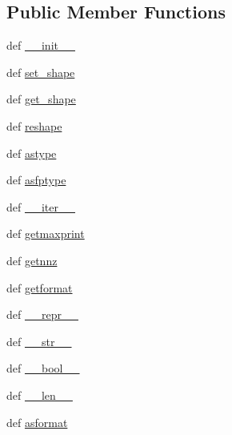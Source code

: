 \subsection*{Public Member Functions}
\begin{DoxyCompactItemize}
\item 
def \hyperlink{classscipy_1_1sparse_1_1base_1_1spmatrix_a10682329413058faa2f58e4ad34b4469}{\+\_\+\+\_\+init\+\_\+\+\_\+}
\item 
def \hyperlink{classscipy_1_1sparse_1_1base_1_1spmatrix_a03816f51d9e91beff4dbf94513633f03}{set\+\_\+shape}
\item 
def \hyperlink{classscipy_1_1sparse_1_1base_1_1spmatrix_af997a3ba2bc4ea75684e7c1d35b5f38c}{get\+\_\+shape}
\item 
def \hyperlink{classscipy_1_1sparse_1_1base_1_1spmatrix_a659aba351a0a4a8644d0ce277e8a10e7}{reshape}
\item 
def \hyperlink{classscipy_1_1sparse_1_1base_1_1spmatrix_a7c742f4c084727a9bc2ea1edb2e3ab0b}{astype}
\item 
def \hyperlink{classscipy_1_1sparse_1_1base_1_1spmatrix_ab9e8119cf7b76b3cf30a1f1e4e835a8f}{asfptype}
\item 
def \hyperlink{classscipy_1_1sparse_1_1base_1_1spmatrix_aa4b0ce202287c59f20d8e525cf7e1c72}{\+\_\+\+\_\+iter\+\_\+\+\_\+}
\item 
def \hyperlink{classscipy_1_1sparse_1_1base_1_1spmatrix_a2c7726a305fe36c1f869f68add4b4112}{getmaxprint}
\item 
def \hyperlink{classscipy_1_1sparse_1_1base_1_1spmatrix_ab149f40b950bc9503e780bc888fd8862}{getnnz}
\item 
def \hyperlink{classscipy_1_1sparse_1_1base_1_1spmatrix_a8a577d4d1010c6462ef857346de67866}{getformat}
\item 
def \hyperlink{classscipy_1_1sparse_1_1base_1_1spmatrix_a0c98d350fc579a084745bca274bb531e}{\+\_\+\+\_\+repr\+\_\+\+\_\+}
\item 
def \hyperlink{classscipy_1_1sparse_1_1base_1_1spmatrix_acf168ad8726219a0a6f4cd3f3901456b}{\+\_\+\+\_\+str\+\_\+\+\_\+}
\item 
def \hyperlink{classscipy_1_1sparse_1_1base_1_1spmatrix_aeeb4893e3d9b05c2cfdc83d2f3a671b1}{\+\_\+\+\_\+bool\+\_\+\+\_\+}
\item 
def \hyperlink{classscipy_1_1sparse_1_1base_1_1spmatrix_ae362f371daa6bcb97072bcc7fbee9007}{\+\_\+\+\_\+len\+\_\+\+\_\+}
\item 
def \hyperlink{classscipy_1_1sparse_1_1base_1_1spmatrix_ad3552cc144b9a33dce8f2514ee21b476}{asformat}

\end{DoxyCompactItemize}
